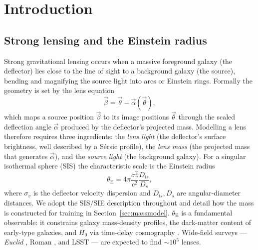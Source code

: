 \documentclass[fleqn,usenatbib]{mnras}
\newcommand{\thetaE}{\theta_{\mathrm{E}}}
\newcommand{\sigmav}{\sigma_{v}}
\begin{document}
\section{Introduction}
\label{sec:intro}

\subsection{Strong lensing and the Einstein radius}
Strong gravitational lensing occurs when a massive foreground galaxy (the
deflector) lies close to the line of sight to a background galaxy (the source),
bending and magnifying the source light into arcs or Einstein rings. Formally
the geometry is set by the lens equation
\begin{equation}
    \vec{\beta} = \vec{\theta} - \vec{\alpha}(\vec{\theta}),
    \label{eq:lenseq}
\end{equation}
which maps a source position $\vec{\beta}$ to its image positions
$\vec{\theta}$ through the scaled deflection angle $\vec{\alpha}$ produced by
the deflector's projected mass. Modelling a lens therefore requires three
ingredients: the \emph{lens light} (the deflector's surface brightness, well
described by a S\'ersic profile), the \emph{lens mass} (the projected mass that
generates $\vec\alpha$), and the \emph{source light} (the background galaxy).
For a singular isothermal sphere (SIS) the characteristic scale is the Einstein
radius
\begin{equation}
    \thetaE = 4\pi \frac{\sigmav^{2}}{c^{2}} \frac{D_{ls}}{D_{s}},
    \label{eq:sis}
\end{equation}
where $\sigmav$ is the deflector velocity dispersion and $D_{ls},D_{s}$ are
angular-diameter distances. We adopt the SIS/SIE description throughout and
detail how the mass is constructed for training in
Section~\ref{sec:massmodel}. $\thetaE$ is a fundamental observable: it
constrains galaxy mass-density profiles, the dark-matter content of early-type
galaxies, and $H_0$ via time-delay cosmography
\citep{Meneghetti2021,Saha2024,Treu2010}. Wide-field surveys ---
\textit{Euclid} \citep{Laureijs2011}, Roman \citep{Spergel2015}, and LSST
\citep{Ivezic2019} --- are expected to find ${\sim}10^{5}$ lenses.
\end{document}
